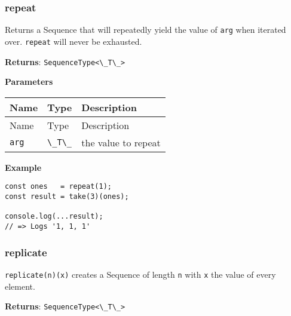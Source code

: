 \hypertarget{b8320e90-38a3-4df2-9770-a69376449fe3}{%
\subsubsection{repeat}\label{b8320e90-38a3-4df2-9770-a69376449fe3}}

Returns a Sequence that will repeatedly yield the value of
\passthrough{\lstinline!arg!} when iterated over.
\passthrough{\lstinline!repeat!} will never be exhausted.

\textbf{Returns}: \passthrough{\lstinline!SequenceType<\_T\_>!}

\textbf{Parameters}

\begin{longtable}[]{
  >{\raggedright\arraybackslash}p{}
  >{\raggedright\arraybackslash}p{}
  >{\raggedright\arraybackslash}p{}@{}}

\toprule\noalign{}
Name & Type & Description \\
\midrule\noalign{}
\endfirsthead
\toprule\noalign{}
Name & Type & Description \\
\midrule\noalign{}
\endhead
\bottomrule\noalign{}
\endlastfoot
\passthrough{\lstinline!arg!} & \passthrough{\lstinline!\_T\_!} & the
value to repeat \\
\end{longtable}

\textbf{Example}

\begin{lstlisting}[label=bd4ef248-0e38-4975-9d86-0bd39d562690]
const ones   = repeat(1);
const result = take(3)(ones);
                             
console.log(...result);
// => Logs '1, 1, 1'
\end{lstlisting}

\hypertarget{deb72945-4996-448f-a8dc-5256934ab44c}{%
\subsubsection{replicate}\label{deb72945-4996-448f-a8dc-5256934ab44c}}

\passthrough{\lstinline!replicate(n)(x)!} creates a Sequence of length
\passthrough{\lstinline!n!} with \passthrough{\lstinline!x!} the value
of every element.

\textbf{Returns}: \passthrough{\lstinline!SequenceType<\_T\_>!}

